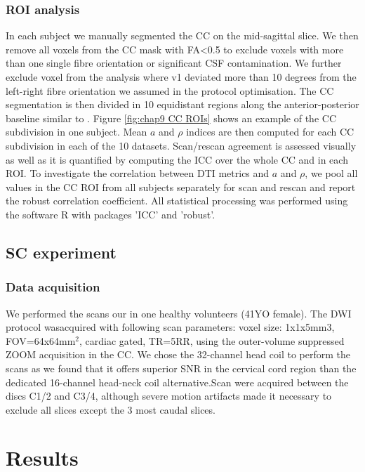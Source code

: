 \subsubsection*{ROI analysis} 
In each subject we manually segmented the CC on the mid-sagittal slice. We then remove all voxels from the CC mask with FA<0.5 to exclude voxels with more than one single fibre orientation or significant CSF contamination. We further exclude voxel from the analysis where v1 deviated more than 10 degrees from the left-right fibre orientation we assumed in the protocol optimisation. The CC segmentation is then divided in 10 equidistant regions along the anterior-posterior baseline similar to \cite{Aboitiz:1992}. Figure \ref{fig:chap9 CC ROIs} shows an example of the CC subdivision in one subject. Mean $a$ and $\rho$ indices are then computed for each CC subdivision in each of the 10 datasets. Scan/rescan agreement is assessed visually as well as it is quantified by computing the \gls{ICC} \citep{Shrout:1979} over the whole CC and in each \gls{ROI}. To investigate the correlation between DTI metrics and $a$ and $\rho$, we pool all values in the CC ROI from all subjects separately for scan and rescan and report the robust correlation coefficient\citep{Huber:1996}. All statistical processing was performed using the software R\citep{RCoreTeam:2012} with packages 'ICC'\citep{Wolak:2011} and 'robust'\citep{Wang:2012}.

\subsection{SC experiment}
\subsubsection*{Data acquisition}
We performed the scans  our \SFasym{} in one healthy volunteers (41YO female). The \SF{} DWI protocol wasacquired with following scan parameters: voxel size: 1x1x5mm3, FOV=64x64mm$^2$, cardiac gated, TR=5RR, using the outer-volume suppressed ZOOM acquisition \citep{Wilm:2007} in the CC. We chose the 32-channel head coil to perform the scans as we found that it offers superior SNR in the cervical cord region than the dedicated 16-channel head-neck coil alternative.Scan were acquired between the discs C1/2 and C3/4, although severe motion artifacts made it necessary to exclude all slices except the 3 most caudal slices. 

\FloatBarrier
\section{Results}
